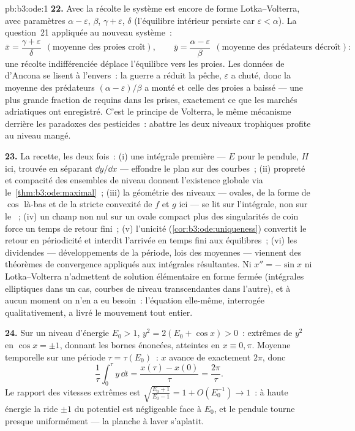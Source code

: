 \begin{solution}{pb:b3:ode:1}
\textbf{22.} Avec la récolte le système est encore de forme
Lotka--Volterra, avec paramètres $\alpha - \varepsilon$,
$\beta$, $\gamma + \varepsilon$, $\delta$ (l'équilibre
intérieur persiste car $\varepsilon < \alpha$). La
question~21 appliquée au nouveau système~:
\[
\bar x = \frac{\gamma + \varepsilon}{\delta}
\ \ (\text{moyenne des proies croît}),
\qquad
\bar y = \frac{\alpha - \varepsilon}{\beta}
\ \ (\text{moyenne des prédateurs décroît}) :
\]
une récolte indifférenciée déplace l'équilibre vers les
proies. Les données de d'Ancona se lisent à l'envers~: la
guerre a réduit la pêche, $\varepsilon$ a chuté, donc la
moyenne des prédateurs $(\alpha - \varepsilon)/\beta$ a
monté et celle des proies a baissé --- une plus grande
fraction de requins dans les prises, exactement ce que les
marchés adriatiques ont enregistré. C'est le principe de
Volterra, le même mécanisme derrière les paradoxes des
pesticides~: abattre les deux niveaux trophiques profite au
niveau mangé.

\textbf{23.} La recette, les deux fois~: (i) une intégrale
première --- $E$ pour le pendule, $H$ ici, trouvée en
séparant $\dd y/\dd x$ --- effondre le plan sur des
courbes~; (ii) propreté et compacité des ensembles de niveau
donnent l'existence globale via
le~\cref{thm:b3:ode:maximal}~; (iii) la géométrie des
niveaux --- ovales, de la forme de $\cos$ là-bas et de la
stricte convexité de $f$ et $g$ ici --- se lit sur
l'intégrale, non sur le ~; (iv) un champ non nul sur un
ovale compact plus des singularités de coin 
force un temps de retour fini~; (v) l'unicité
(\cref{cor:b3:ode:uniqueness}) convertit le retour en
périodicité et interdit l'arrivée en temps fini aux
équilibres~; (vi) les dividendes --- développements de la
période, lois des moyennes --- viennent des théorèmes de
convergence appliqués aux intégrales résultantes. Ni $x'' =
-\sin x$ ni Lotka--Volterra n'admettent de solution
élémentaire en forme fermée (intégrales elliptiques dans un
cas, courbes de niveau transcendantes dans l'autre), et à
aucun moment on n'en a eu besoin~: l'équation elle-même,
interrogée qualitativement, a livré le mouvement tout
entier.

\textbf{24.} Sur un niveau d'énergie $E_0 > 1$, $y^2 =
2(E_0 + \cos x) > 0$~: extrêmes de $y^2$ en $\cos x =
\pm1$, donnant les bornes énoncées, atteintes en $x \equiv
0, \pi$. Moyenne temporelle sur une période $\tau =
\tau(E_0)$~: $x$ avance de exactement $2\pi$, donc
\[
\frac1\tau\int_0^\tau y\,\dd t = \frac{x(\tau) -
x(0)}{\tau} = \frac{2\pi}\tau .
\]
Le rapport des vitesses extrêmes est $\sqrt{\frac{E_0 +
1}{E_0 - 1}} = 1 + O(E_0^{-1}) \to 1$~: à haute énergie la
ride $\pm1$ du potentiel est négligeable face à $E_0$, et le
pendule tourne presque uniformément --- la planche à laver
s'aplatit.


\end{solution}
